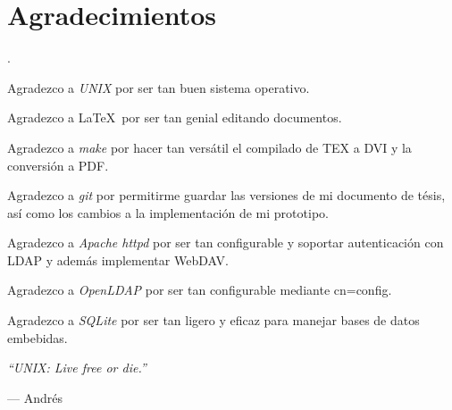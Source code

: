 \cleardoublepage  
\chapter*{Agradecimientos}
\label{chap:ack}

.


Agradezco a \emph{UNIX} por ser tan buen sistema operativo.


Agradezco a \LaTeX\ por ser tan genial editando documentos.


Agradezco a \emph{make} por hacer tan vers\'{a}til el compilado de TEX a DVI y la conversi\'{o}n a PDF.


Agradezco a \emph{git} por permitirme guardar las versiones de mi documento de t\'{e}sis, as\'{i} como los cambios a la implementaci\'{o}n de mi prototipo.


Agradezco a \emph{Apache httpd} por ser tan configurable y soportar autenticaci\'{o}n con LDAP y adem\'{a}s implementar WebDAV.


Agradezco a \emph{OpenLDAP} por ser tan configurable mediante cn=config.


Agradezco a \emph{SQLite} por ser tan ligero y eficaz para manejar bases de datos embebidas.


\vspace{1cm}

\emph{``UNIX: Live free or die.''}

\hfill --- Andr\'{e}s
